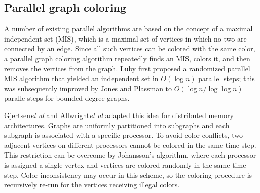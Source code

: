 \documentclass[preprint]{sigplanconf}
\newcommand{\etal}{\emph{et al}\xspace}
\begin{document}
\subsection{Parallel graph coloring}

A number of existing parallel algorithms are based on the concept of a maximal independent set (MIS), which is a maximal set of vertices in which no two are connected by an edge. Since all such vertices can be colored with the same color, a parallel graph coloring algorithm repeatedly finds an MIS, colors it, and then removes the vertices from the graph. Luby \cite{luby1985simple} first proposed a randomized parallel MIS algorithm that yielded an independent set in $O(\log n)$ parallel steps; this was subsequently improved by Jones  and Plassman\cite{jones1993parallel}  to $O(\log n/\log\log n)$ paralle steps for bounded-degree graphs.



Gjertsen\etal\cite{gjertsen1996parallel} and Allwright\etal \cite{allwright1995comparison} adapted this idea for distributed memory architectures.  Graphs are uniformly partitioned into subgraphs and each subgraph is associated with a specific processor.  To avoid color conflicts, two adjacent vertices on different processors cannot be colored in the same time step. This restriction can be overcome by Johansson’s algorithm\cite{}, where each processor is assigned a single vertex and vertices are colored randomly in the same time step. Color inconsistency may occur in this  scheme, so the coloring procedure is recursively re-run for the vertices receiving illegal colors.
\end{document}
